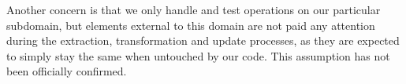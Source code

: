 Another concern is that we only handle and test operations on our particular subdomain, but elements external to this domain are not paid any attention during the extraction, transformation and update processes, as they are expected to simply stay the same when untouched by our code. This assumption has not been officially confirmed.







